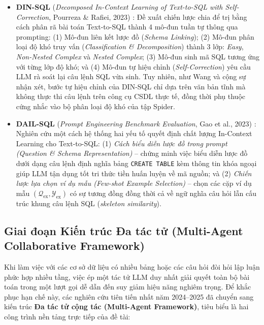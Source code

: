 \documentclass[12pt,a4paper]{report}
\begin{document}
\begin{itemize}
    \item \textbf{DIN-SQL} (\textit{Decomposed In-Context Learning of Text-to-SQL with Self-Correction}, Pourreza \& Rafiei, 2023) \cite{pourreza2023dinsql}: Đề xuất chiến lược chia để trị bằng cách phân rã bài toán Text-to-SQL thành 4 mô-đun tuần tự thông qua prompting: (1) Mô-đun liên kết lược đồ (\textit{Schema Linking}); (2) Mô-đun phân loại độ khó truy vấn (\textit{Classification \& Decomposition}) thành 3 lớp: \textit{Easy}, \textit{Non-Nested Complex} và \textit{Nested Complex}; (3) Mô-đun sinh mã SQL tương ứng với từng lớp độ khó; và (4) Mô-đun tự hiệu chỉnh (\textit{Self-Correction}) yêu cầu LLM rà soát lại câu lệnh SQL vừa sinh. Tuy nhiên, như Wang và cộng sự \cite{wang2025macsql} nhận xét, bước tự hiệu chỉnh của DIN-SQL chỉ dựa trên văn bản tĩnh mà không thực thi câu lệnh trên công cụ CSDL thực tế, đồng thời phụ thuộc cứng nhắc vào bộ phân loại độ khó của tập Spider.
    \item \textbf{DAIL-SQL} (\textit{Prompt Engineering Benchmark Evaluation}, Gao et al., 2023) \cite{gao2023dailsql}: Nghiên cứu một cách hệ thống hai yếu tố quyết định chất lượng In-Context Learning cho Text-to-SQL: (1) \textit{Cách biểu diễn lược đồ trong prompt (Question \& Schema Representation)} -- chứng minh việc biểu diễn lược đồ dưới dạng câu lệnh định nghĩa bảng \texttt{CREATE TABLE} kèm thông tin khóa ngoại giúp LLM tận dụng tốt tri thức tiền huấn luyện về mã nguồn; và (2) \textit{Chiến lược lựa chọn ví dụ mẫu (Few-shot Example Selection)} -- chọn các cặp ví dụ mẫu $(\mathcal{Q}_{\text{ex}}, \mathcal{Y}_{\text{ex}})$ có sự tương đồng đồng thời cả về ngữ nghĩa câu hỏi lẫn cấu trúc khung câu lệnh SQL (\textit{skeleton similarity}).
\end{itemize}

\subsection{Giai đoạn Kiến trúc Đa tác tử (Multi-Agent Collaborative Framework)}

Khi làm việc với các cơ sở dữ liệu có nhiều bảng hoặc các câu hỏi đòi hỏi lập luận phức hợp nhiều tầng, việc ép một tác tử LLM duy nhất giải quyết toàn bộ bài toán trong một lượt gọi dễ dẫn đến suy giảm hiệu năng nghiêm trọng. Để khắc phục hạn chế này, các nghiên cứu tiên tiến nhất năm 2024--2025 đã chuyển sang kiến trúc \textbf{Đa tác tử cộng tác (Multi-Agent Framework)}, tiêu biểu là hai công trình nền tảng trực tiếp của đề tài:
\end{document}
